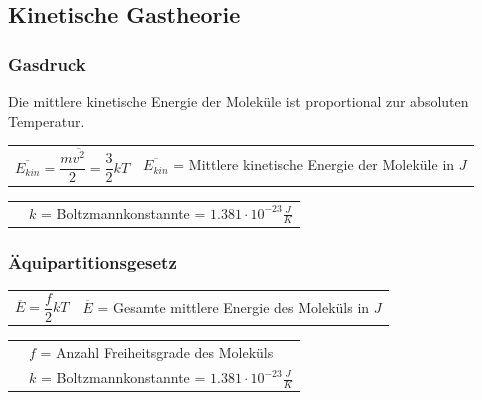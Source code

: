 	\subsection{Kinetische Gastheorie}
		\begin{minipage}[t]{15cm}
			\subsubsection{Gasdruck}
				Die mittlere kinetische Energie der Moleküle ist proportional zur absoluten Temperatur.
				\newline
				\newline
				\renewcommand{\arraystretch}{2.5}
				\begin{tabular}{ p{4cm} | p{10cm}}
					$\overline{E_{kin}} = \dfrac{m\overline{v^2}}{2} = \dfrac{3}{2}kT$	&	$\overline{E_{kin}}$ = Mittlere kinetische Energie der Moleküle in $J$\\
				\end{tabular}
				\renewcommand{\arraystretch}{1.5}
				\begin{tabular}{ p{4cm} | p{7cm} }
					& $k$ = Boltzmannkonstannte =  $1.381 \cdot 10^{-23} \frac{J}{K}$\\
				\end{tabular} 
				\renewcommand{\arraystretch}{1}
		\end{minipage}
		\newline
		\newline
		\newline
		\newline
		\begin{minipage}[t]{10cm}
			\subsubsection{Äquipartitionsgesetz}
				\renewcommand{\arraystretch}{2.5}
				\begin{tabular}{ p{4cm} | p{7cm}}
					$\overline{E} = \dfrac{f}{2}kT$	&	$\overline{E}$ = Gesamte mittlere Energie des Moleküls in $J$\\
				\end{tabular}
				\renewcommand{\arraystretch}{1.5}
				\begin{tabular}{ p{4cm} | p{7cm} }
					& $f$ = Anzahl Freiheitsgrade des Moleküls\\
					& $k$ = Boltzmannkonstannte =  $1.381 \cdot 10^{-23} \frac{J}{K}$\\
				\end{tabular} 
				\renewcommand{\arraystretch}{1}
		\end{minipage}
